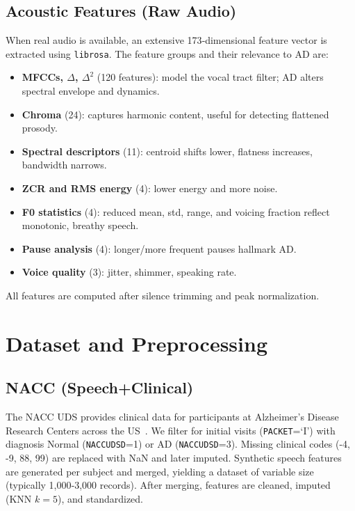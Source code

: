 \documentclass[conference]{IEEEtran}
\begin{document}
\subsection{Acoustic Features (Raw Audio)}
When real audio is available, an extensive 173‑dimensional feature vector is extracted using \texttt{librosa}. The feature groups and their relevance to AD are:
\begin{itemize}[leftmargin=*, nosep]
  \item \textbf{MFCCs, $\Delta$, $\Delta^2$} (120 features): model the vocal tract filter; AD alters spectral envelope and dynamics.
  \item \textbf{Chroma} (24): captures harmonic content, useful for detecting flattened prosody.
  \item \textbf{Spectral descriptors} (11): centroid shifts lower, flatness increases, bandwidth narrows.
  \item \textbf{ZCR and RMS energy} (4): lower energy and more noise.
  \item \textbf{F0 statistics} (4): reduced mean, std, range, and voicing fraction reflect monotonic, breathy speech.
  \item \textbf{Pause analysis} (4): longer/more frequent pauses hallmark AD.
  \item \textbf{Voice quality} (3): jitter, shimmer, speaking rate.
\end{itemize}
All features are computed after silence trimming and peak normalization.

\section{Dataset and Preprocessing}
\subsection{NACC (Speech+Clinical)}
The NACC UDS provides clinical data for participants at Alzheimer's Disease Research Centers across the US~\cite{nacc}. We filter for initial visits (\texttt{PACKET}=`I') with diagnosis Normal (\texttt{NACCUDSD}=1) or AD (\texttt{NACCUDSD}=3). Missing clinical codes (-4, -9, 88, 99) are replaced with NaN and later imputed. Synthetic speech features are generated per subject and merged, yielding a dataset of variable size (typically 1,000‑3,000 records). After merging, features are cleaned, imputed (KNN $k=5$), and standardized.
\end{document}
